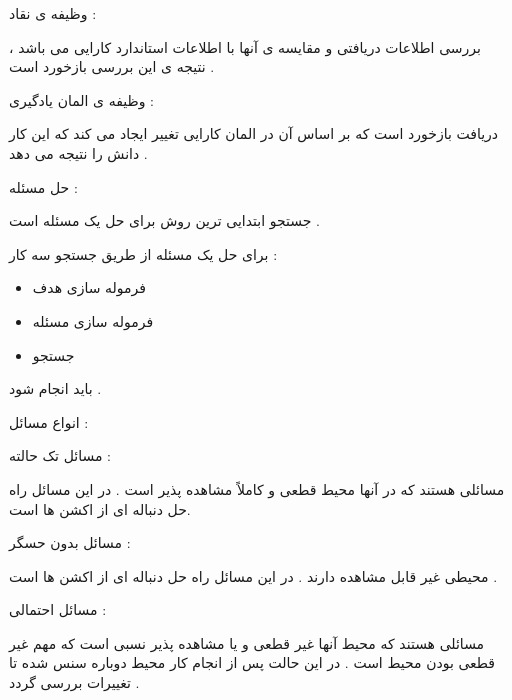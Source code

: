 \documentclass[12pt]{article}
\begin{document}
\vspace{10pt}

\noindent
وظیفه ی نقاد : 

\noindent
بررسی اطلاعات دریافتی و مقایسه ی آنها با اطلاعات استاندارد کارایی می باشد ، نتیجه ی این بررسی بازخورد است .


\vspace{10pt}

\noindent
وظیفه ی المان یادگیری : 

\noindent
دریافت بازخورد است که بر اساس آن در المان کارایی تغییر ایجاد می کند که این کار دانش را نتیجه می دهد .






\vspace{30pt}

\noindent
حل مسئله :

\noindent
جستجو ابتدایی ترین روش برای حل یک مسئله است .


\noindent
برای حل یک مسئله از طریق جستجو سه کار :


\begin{itemize}
	\item فرموله سازی هدف
	\item فرموله سازی مسئله
	\item جستجو
\end{itemize}

\noindent
باید انجام شود .



\vspace{30pt}

\noindent
انواع مسائل :

\noindent
مسائل تک حالته 
 :

\noindent
مسائلی هستند که در آنها محیط قطعی و کاملاً مشاهده پذیر است . در این مسائل راه حل دنباله ای از اکشن ها است.


\vspace{10pt}

\noindent
مسائل بدون حسگر 
 :

\noindent
محیطی غیر قابل مشاهده دارند . در این مسائل راه حل دنباله ای از اکشن ها است .


\vspace{10pt}

\noindent
مسائل احتمالی 
 :

\noindent
مسائلی هستند که محیط آنها غیر قطعی و یا مشاهده پذیر نسبی است که مهم غیر قطعی بودن محیط است . در این حالت پس از انجام کار محیط دوباره سنس شده تا تغییرات بررسی گردد .
\end{document}

